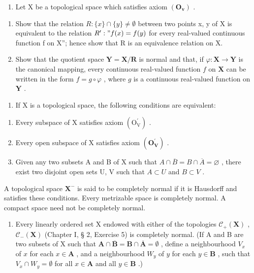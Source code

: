 \begin{enumerate}
\def\labelenumi{\arabic{enumi})}
\setcounter{enumi}{1}
\tightlist
\item
  Let X be a topological space which satisfies axiom \((\mathbf{O}_{\mathbf{v}})\) .
\end{enumerate}

\begin{enumerate}
\def\labelenumi{\alph{enumi})}
\item
  Show that the relation \(R: \{x\} \cap \{y\} \neq \emptyset\) between two points x, y of X is equivalent to the relation \(R' : "f(x) = f(y)\) for every real-valued continuous function f on X''; hence show that R is an equivalence relation on X.
\item
  Show that the quotient space \(\mathbf{Y} = \mathbf{X} / \mathbf{R}\) is normal and that, if \(\varphi: \mathbf{X} \to \mathbf{Y}\) is the canonical mapping, every continuous real-valued function \(f\) on \(\mathbf{X}\) can be written in the form \(f = g \circ \varphi\) , where \(g\) is a continuous real-valued function on \(\mathbf{Y}\) .
\end{enumerate}

\begin{enumerate}
\def\labelenumi{\arabic{enumi})}
\setcounter{enumi}{2}
\tightlist
\item
  If X is a topological space, the following conditions are equivalent:
\end{enumerate}

\begin{enumerate}
\def\labelenumi{\alph{enumi})}
\item
  Every subspace of X satisfies axiom \((\mathrm{O}_{\mathrm{V}}^{\prime})\) .
\item
  Every open subspace of X satisfies axiom \((\mathbf{O}_{\mathbf{V}}^{\prime})\) .
\item
  Given any two subsets A and B of X such that \(A \cap \overline{B} = B \cap \overline{A} = \varnothing\) , there exist two disjoint open sets U, V such that \(A \subset U\) and \(B \subset V\) .
\end{enumerate}

A topological space \(\mathbf{X}^{-}\) is said to be completely normal if it is Hausdorff and satisfies these conditions. Every metrizable space is completely normal. A compact space need not be completely normal.

\begin{enumerate}
\def\labelenumi{\arabic{enumi})}
\setcounter{enumi}{3}
\tightlist
\item
  Every linearly ordered set X endowed with either of the topologies \(\mathcal{C}_{+}(\mathbf{X})\) , \(\mathcal{C}_{-}(\mathbf{X})\) (Chapter I, § 2, Exercise 5) is completely normal. (If A and B are two subsets of X such that \(\mathbf{A} \cap \overline{\mathbf{B}} = \mathbf{B} \cap \overline{\mathbf{A}} = \emptyset\) , define a neighbourhood \(V_{x}\) of \(x\) for each \(x \in \mathbf{A}\) , and a neighbourhood \(W_{y}\) of \(y\) for each \(y \in \mathbf{B}\) , such that \(V_{x} \cap W_{y} = \emptyset\) for all \(x \in \mathbf{A}\) and all \(y \in \mathbf{B}\) .)
\end{enumerate}

